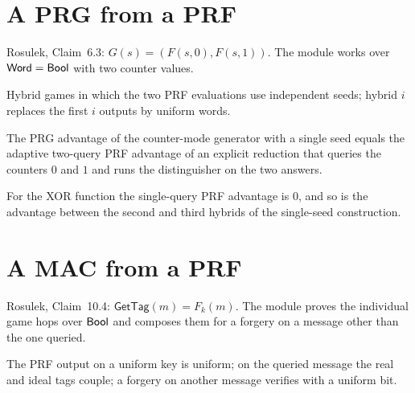 \section{A PRG from a PRF}

Rosulek, Claim~6.3: $G(s) = (F(s, 0), F(s, 1))$. The module works over
$\mathsf{Word} = \mathsf{Bool}$ with two counter values.

\begin{definition}
  \label{def:prfprg-decomp}
  \leanok
  Hybrid games in which the two PRF evaluations use independent seeds; hybrid
  $i$ replaces the first $i$ outputs by uniform words.
\end{definition}

\begin{theorem}
  \label{thm:prfprg-bound}
  \leanok
  The PRG advantage of the counter-mode generator with a single seed equals the
  adaptive two-query PRF advantage of an explicit reduction that queries the
  counters $0$ and $1$ and runs the distinguisher on the two answers.
\end{theorem}

\begin{theorem}
  \label{thm:prfprg-xor}
  \leanok
  For the XOR function the single-query PRF advantage is $0$, and so is the
  advantage between the second and third hybrids of the single-seed construction.
\end{theorem}

\section{A MAC from a PRF}

Rosulek, Claim~10.4: $\mathsf{GetTag}(m) = F_k(m)$. The module proves the
individual game hops over $\mathsf{Bool}$ and composes them for a forgery on a message
other than the one queried.

\begin{lemma}
  \label{lem:prfmac-hops}
  \leanok
  The PRF output on a uniform key is uniform; on the queried message the real and
  ideal tags couple; a forgery on another message verifies with a uniform bit.
\end{lemma}


